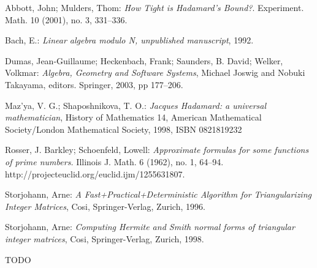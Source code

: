 \begin{thebibliography}{10}

Abbott, John; Mulders, Thom: \textit{How Tight is Hadamard's Bound?}.
Experiment. Math. 10 (2001), no. 3, 331--336.

Bach, E.: \textit{Linear algebra modulo N, unpublished manuscript}, 1992.

Dumas, Jean-Guillaume; Heckenbach, Frank; Saunders, B. David; Welker, Volkmar:
\textit{Algebra, Geometry and Software Systems}, Michael Joswig and Nobuki Takayama, editors. Springer, 2003, pp 177--206.

Maz'ya, V. G.; Shaposhnikova, T. O.: \textit{Jacques Hadamard: a universal mathematician},
History of Mathematics 14, American Mathematical Society/London Mathematical Society, 1998, ISBN 0821819232

Rosser, J. Barkley; Schoenfeld, Lowell: \textit{Approximate formulas for some functions of prime numbers.}
Illinois J. Math. 6 (1962), no. 1, 64--94. http://projecteuclid.org/euclid.ijm/1255631807.

Storjohann, Arne: \textit{A Fast+Practical+Deterministic Algorithm for Triangularizing Integer Matrices},
Cosi, Springer-Verlag, Zurich, 1996.

Storjohann, Arne: \textit{Computing Hermite and Smith normal forms
of triangular integer matrices},
Cosi, Springer-Verlag, Zurich, 1998.

TODO





\end{thebibliography}

\cleardoublepage
